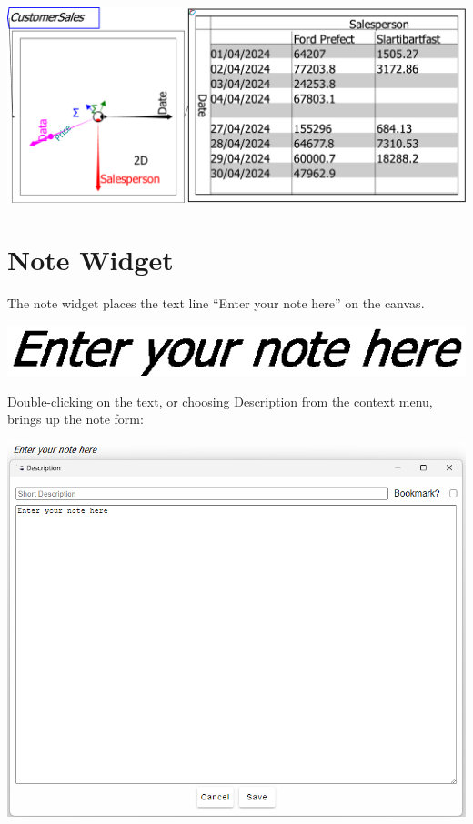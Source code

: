 \includegraphics[width=\textwidth]{images/SheetHeadTailSmallBusiness}

\section{Note Widget}

\label{Notes}\label{Item}


The note widget places the text line ``Enter your note here'' on
the canvas.

\includegraphics{images/note}

Double-clicking on the text, or choosing Description from the context
menu, brings up the note form:

\noindent\includegraphics[width=\textwidth]{images/NoteWindow}

